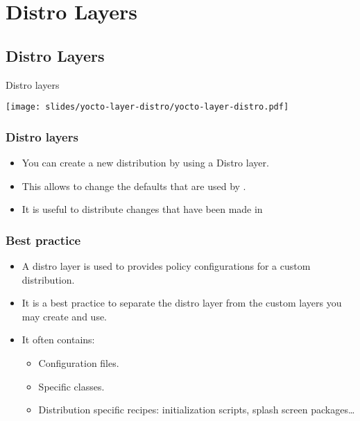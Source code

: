 \section{Distro Layers}

\subsection{Distro Layers}

\begin{frame}{Distro layers}
  \begin{center}
    \texttt{[image: slides/yocto-layer-distro/yocto-layer-distro.pdf]}
  \end{center}
\end{frame}

\begin{frame}
  \frametitle{Distro layers}
  \begin{itemize}
    \item You can create a new distribution by using a Distro layer.
    \item This allows to change the defaults that are used by
      .
    \item It is useful to distribute changes that have been made in
  \end{itemize}
\end{frame}

\begin{frame}
  \frametitle{Best practice}
  \begin{itemize}
    \item A distro layer is used to provides policy configurations for
      a custom distribution.
    \item It is a best practice to separate the distro layer from the
      custom layers you may create and use.
    \item It often contains:
      \begin{itemize}
        \item Configuration files.
        \item Specific classes.
        \item Distribution specific recipes: initialization scripts,
          splash screen packages\dots
      \end{itemize}
  \end{itemize}
\end{frame}

